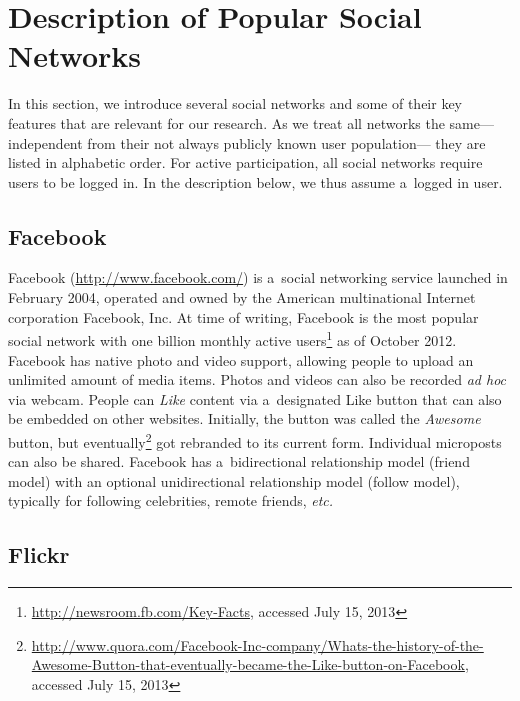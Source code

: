 \section{Description of Popular Social Networks}
\label{sec:description-of-popular-social-networks}

In this section, we introduce several social networks
and some of their key features
that are relevant for our research.
As we treat all networks the same---%
independent from their not always publicly known user population---%
they are listed in alphabetic order.
For active participation,
all social networks require users to be logged in.
In the description below, we thus assume a~logged in user.

\subsection{Facebook}

Facebook (\url{http://www.facebook.com/})
is a~social networking service launched in February 2004,
operated and owned by the American multinational
Internet corporation Facebook, Inc.
At time of writing, Facebook is the most popular social network
with one billion monthly active
users\footnote{\url{http://newsroom.fb.com/Key-Facts},
accessed July 15, 2013}
as of October 2012.
Facebook has native photo and video support,
allowing people to upload an unlimited amount of media items.
Photos and videos can also be recorded \emph{ad hoc} via webcam.
People can \emph{Like} content via a~designated Like button
that can also be embedded on other websites.
Initially, the button was called the \emph{Awesome} button,
but eventually\footnote{\url{http://www.quora.com/Facebook-Inc-company/Whats-the-history-of-the-Awesome-Button-that-eventually-became-the-Like-button-on-Facebook}, accessed July 15, 2013}
got rebranded to its current form.
Individual microposts can also be shared.
Facebook has a~bidirectional relationship model (friend model)
with an optional unidirectional relationship model (follow model),
typically for following celebrities, remote friends, \emph{etc.}

\subsection{Flickr}
\label{sec:flickr}

